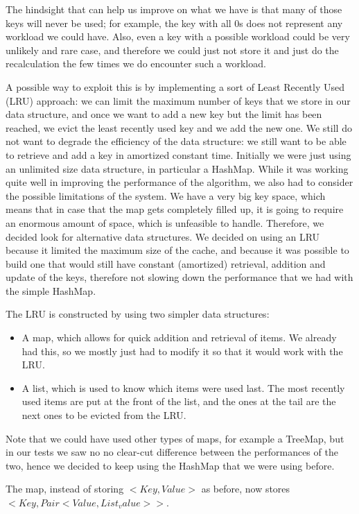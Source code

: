 The hindsight that can help us improve on what we have is that many of those keys will never be used; for example, the key with all 0s does not represent any workload we could have. Also, even a key with a possible workload could be very unlikely and rare case, and therefore we could just not store it and just do the recalculation the few times we do encounter such a workload. 

A possible way to exploit this is by implementing a sort of Least Recently Used (LRU) approach: we can limit the maximum number of keys that we store in our data structure, and once we want to add a new key but the limit has been reached, we evict the least recently used key and we add the new one. We still do not want to degrade the efficiency of the data structure: we still want to be able to retrieve and add a key in amortized constant time. Initially we were just using an unlimited size data structure, in particular a HashMap. While it was working quite well in improving the performance of the algorithm, we also had to consider the possible limitations of the system. We have a very big key space, which means that in case that the map gets completely filled up, it is going to require an enormous amount of space, which is unfeasible to handle. Therefore, we decided look for alternative data structures. We decided on using an LRU because it limited the maximum size of the cache, and because it was possible to build one that would still have constant (amortized) retrieval, addition and update of the keys, therefore not slowing down the performance that we had with the simple HashMap.

The LRU is constructed by using two simpler data structures:
\begin{itemize}  
  \item A map, which allows for quick addition and retrieval of items. We already had this, so we mostly just had to modify it so that it would work with the LRU.
  \item A list, which is used to know which items were used last. The most recently used items are put at the front of the list, and the ones at the tail are the next ones to be evicted from the LRU.
\end{itemize}

Note that we could have used other types of maps, for example a TreeMap, but in our tests we saw no no clear-cut difference between the performances of the two, hence we decided to keep using the HashMap that we were using before.

The map, instead of storing $<Key, Value>$ as before, now stores $<Key, Pair<Value, List_value>>$.

